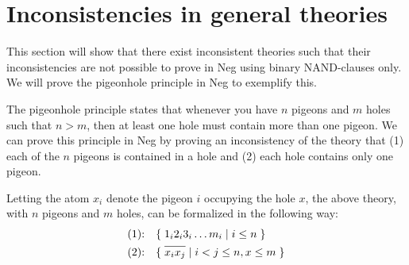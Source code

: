 
\section{Inconsistencies in general theories}
\label{sec:Inconsistencies in general theories}
This section will show that there exist inconsistent theories such that their inconsistencies are not possible to prove in Neg using binary NAND-clauses only.
We will prove the pigeonhole principle in Neg to exemplify this.

The pigeonhole principle states that whenever you have $n$ pigeons and $m$ holes such that $n > m$, then at least one hole must contain more than one pigeon.
We can prove this principle in Neg by proving an inconsistency of the theory that (1) each of the $n$ pigeons is contained in a hole and (2) each hole contains only one pigeon.

Letting the atom $x_i$ denote the pigeon $i$ occupying the hole $x$, the above theory, with $n$ pigeons and $m$ holes, can be formalized in the following way:
\begin{align}
  \text{(1):}\quad &\{ \; 1_i2_i3_i\dots m_i \;|\; i \leq n \; \}\\
  \text{(2):}\quad &\{ \; \ol{x_ix_j} \;|\; i < j \leq n, x \leq m \; \}
\end{align}

